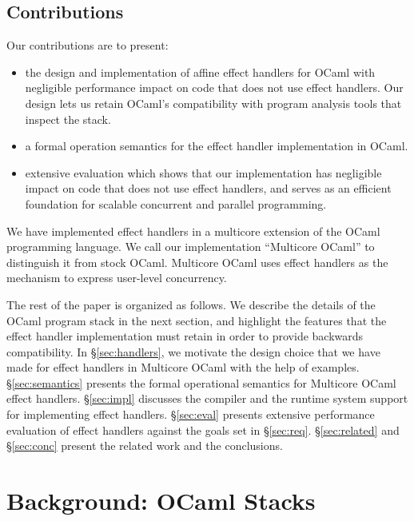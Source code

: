 \documentclass[sigplan,10pt,review,anonymous]{acmart}\settopmatter{printfolios=true,printccs=false,printacmref=false}
\begin{document}
\subsection{Contributions}

Our contributions are to present:

\begin{itemize}
	\item the design and implementation of affine effect handlers for OCaml with
		negligible performance impact on code that does not use effect handlers.
		Our design lets us retain OCaml's compatibility with program analysis tools
		that inspect the stack.
	\item a formal operation semantics for the effect handler implementation in
		OCaml.
	\item extensive evaluation which shows that our implementation has negligible
		impact on code that does not use effect handlers, and serves as an
		efficient foundation for scalable concurrent and parallel programming.
\end{itemize}

We have implemented effect handlers in a multicore extension of the OCaml
programming language. We call our implementation ``Multicore OCaml'' to
distinguish it from stock OCaml. Multicore OCaml uses effect handlers as the
mechanism to express user-level concurrency.

The rest of the paper is organized as follows. We describe the details of the
OCaml program stack in the next section, and highlight the features that the
effect handler implementation must retain in order to provide backwards
compatibility. In \S\ref{sec:handlers}, we motivate the design choice that we
have made for effect handlers in Multicore OCaml with the help of examples.
\S\ref{sec:semantics} presents the formal operational semantics for Multicore
OCaml effect handlers. \S\ref{sec:impl} discusses the compiler and the runtime
system support for implementing effect handlers. \S\ref{sec:eval} presents
extensive performance evaluation of effect handlers against the goals set in
\S\ref{sec:req}. \S\ref{sec:related} and \S\ref{sec:conc} present the related
work and the conclusions.

\section{Background: OCaml Stacks}
\label{sec:stack}
\end{document}
